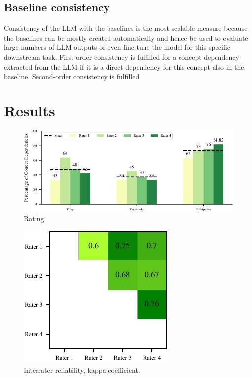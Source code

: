 \documentclass{article}
\begin{document}
\subsection{Baseline consistency}
Consistency of the LLM with the baselines is the most scalable measure because the baselines can be mostly created automatically and hence be used to evaluate large numbers of LLM outputs or even fine-tune the model for this specific downstream task. First-order consistency is fulfilled for a concept dependency extracted from the LLM if it is a direct dependency for this concept also in the baseline. Second-order consistency is fulfilled 

\section{Results}



\begin{figure}[H]
    \centering
    \includegraphics[width=.95\textwidth]{img/rating.pdf}
    \caption{Rating.}
    \label{fig:rating}
\end{figure}

\begin{figure}[H]
    \centering
    \includegraphics[width=.4\textwidth]{img/kappa.pdf}
    \caption{Interrater reliability, kappa coefficient.}
    \label{fig:kappa}
\end{figure}
\end{document}
